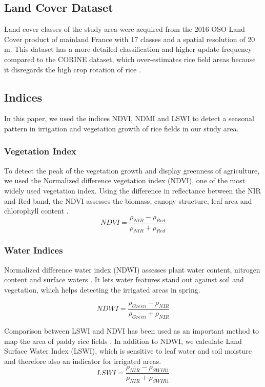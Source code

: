 \documentclass[a4paper, 10pt, conference]{ieeeconf}      %
\begin{document}
\subsection{Land Cover Dataset}
Land cover classes of the study area were acquired from the 2016 OSO Land Cover product of mainland France with 17 classes and a spatial resolution of 20 m. This dataset has a more detailed classification and higher update frequency compared to the CORINE dataset, which over-estimates rice field areas because it disregards the high crop rotation of rice \cite{Perennou2012ExistingOverview}.

\subsection{Indices}
In this paper, we used the indices NDVI, NDMI and LSWI to detect a seasonal pattern in irrigation and vegetation growth of rice fields in our study area.
\subsubsection{Vegetation Index}
To detect the peak of the vegetation growth and display greenness of agriculture, we used the Normalized difference vegetation index (NDVI), one of the most widely used vegetation index. Using the difference in reflectance between the NIR and Red band, the NDVI assesses the biomass, canopy structure, leaf area and chlorophyll content \cite{Rouse1974MonitoringSP-351}.
\begin{equation}
\label{eq:ndvi}
NDVI = \frac{\rho_{NIR}-\rho_{Red}}{\rho_{NIR}+\rho_{Red}}
\end{equation}

\subsubsection{Water Indices}

Normalized difference water index (NDWI) assesses plant water content, nitrogen content and surface waters \cite{Gao1996NDWISpace, McFeeters1996TheFeatures}. It lets water features stand out against soil and vegetation, which helps detecting the irrigated areas in spring.

\begin{equation}
NDWI = \frac{\rho_{Green}-\rho_{NIR}}{\rho_{Green}+\rho_{NIR}}    
\label{eq:ndwi}
\end{equation}

Comparison between LSWI and NDVI has been used as an important method to map the area of paddy rice fields \cite{Ryu2011AnalysisClassification}. In addition to NDWI, we calculate Land Surface Water Index (LSWI), which is sensitive to leaf water and soil moisture and therefore also an indicator for irrigated areas. 
\begin{equation}
\label{eq:lswi}
LSWI = \frac{\rho_{NIR}-\rho_{SWIR1}}{\rho_{NIR}+\rho_{SWIR1}}
\end{equation}
\end{document}
